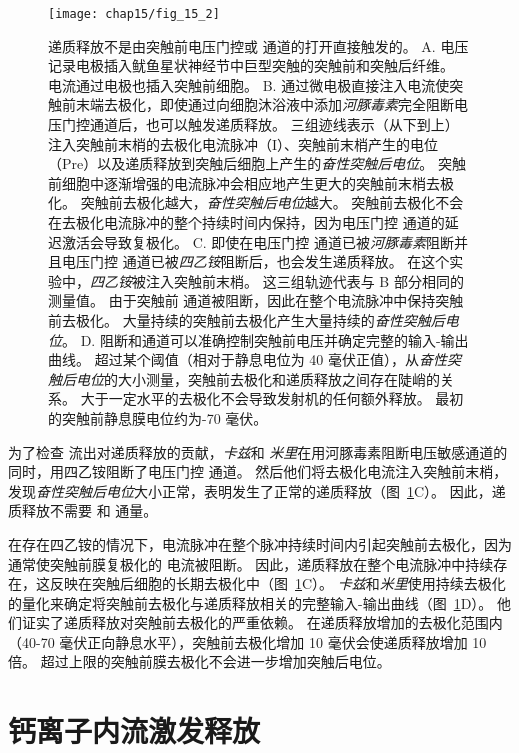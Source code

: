 \begin{figure}[htbp]
	\centering
	\texttt{[image: chap15/fig\_15\_2]}
	\caption{递质释放不是由突触前电压门控或  通道的打开直接触发的\cite{katz1967study}。
	A. 电压记录电极插入鱿鱼星状神经节中巨型突触的突触前和突触后纤维。
	电流通过电极也插入突触前细胞。
	B. 通过微电极直接注入电流使突触前末端去极化，即使通过向细胞沐浴液中添加\textit{河豚毒素}完全阻断电压门控通道后，也可以触发递质释放。
	三组迹线表示（从下到上）注入突触前末梢的去极化电流脉冲（I）、突触前末梢产生的电位（Pre）以及递质释放到突触后细胞上产生的\textit{奋性突触后电位}。
	突触前细胞中逐渐增强的电流脉冲会相应地产生更大的突触前末梢去极化。
	突触前去极化越大，\textit{奋性突触后电位}越大。
	突触前去极化不会在去极化电流脉冲的整个持续时间内保持，因为电压门控  通道的延迟激活会导致复极化。
	C. 即使在电压门控  通道已被\textit{河豚毒素}阻断并且电压门控  通道已被\textit{四乙铵}阻断后，也会发生递质释放。
	在这个实验中，\textit{四乙铵}被注入突触前末梢。
	这三组轨迹代表与 B 部分相同的测量值。
	由于突触前  通道被阻断，因此在整个电流脉冲中保持突触前去极化。
	大量持续的突触前去极化产生大量持续的\textit{奋性突触后电位}。
	D. 阻断和通道可以准确控制突触前电压并确定完整的输入-输出曲线。
	超过某个阈值（相对于静息电位为 40 毫伏正值），从\textit{奋性突触后电位}的大小测量，突触前去极化和递质释放之间存在陡峭的关系。
	大于一定水平的去极化不会导致发射机的任何额外释放。
	最初的突触前静息膜电位约为-70 毫伏。}
	\label{fig:15_2}
\end{figure}


为了检查  流出对递质释放的贡献，\textit{卡兹}和 \textit{米里}在用河豚毒素阻断电压敏感通道的同时，用四乙铵阻断了电压门控  通道。
然后他们将去极化电流注入突触前末梢，发现\textit{奋性突触后电位}大小正常，表明发生了正常的递质释放（图~\ref{fig:15_2}C）。
因此，递质释放不需要  和  通量。


在存在四乙铵的情况下，电流脉冲在整个脉冲持续时间内引起突触前去极化，因为通常使突触前膜复极化的  电流被阻断。
因此，递质释放在整个电流脉冲中持续存在，这反映在突触后细胞的长期去极化中（图~\ref{fig:15_2}C）。
\textit{卡兹}和\textit{米里}使用持续去极化的量化来确定将突触前去极化与递质释放相关的完整输入-输出曲线（图~\ref{fig:15_2}D）。
他们证实了递质释放对突触前去极化的严重依赖。
在递质释放增加的去极化范围内（40-70 毫伏正向静息水平），突触前去极化增加 10 毫伏会使递质释放增加 10 倍。
超过上限的突触前膜去极化不会进一步增加突触后电位。



\section{钙离子内流激发释放}

